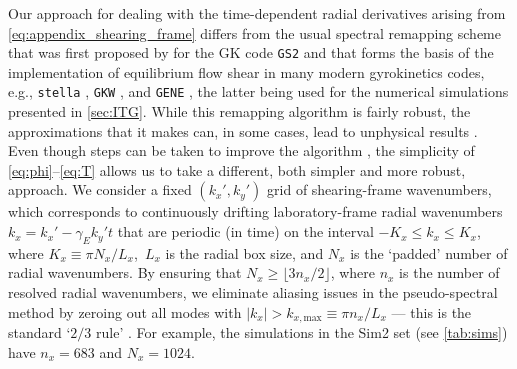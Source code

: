 \documentclass{jpp}
\newcommand{\gammaE}{\gamma_{E}}
\begin{document}
Our approach for dealing with the time-dependent radial derivatives arising from \cref{eq:appendix_shearing_frame} differs from the usual spectral remapping scheme that was first proposed by \mbox{\citet{hammett_flowshear_06}} for the GK code \texttt{GS2} and that forms the basis of the implementation of equilibrium flow shear in many modern gyrokinetics codes, e.g., \texttt{stella} \citep{barnes_stella19, stonge22}, \texttt{GKW} \citep{peeters_gkw09}, and \texttt{GENE} \citep{told_thesis12}, the latter being used for the numerical simulations presented in \cref{sec:ITG}. While this remapping algorithm is fairly robust, the approximations that it makes can, in some cases, lead to unphysical results \citep{mcmillan19}. Even though steps can be taken to improve the algorithm \citep{mcmillan19, christen21}, the simplicity of \mbox{\cref{eq:phi}--\cref{eq:T}} allows us to take a different, both simpler and more robust, approach. We consider a fixed \((k_x', k_y')\) grid of shearing-frame wavenumbers, which corresponds to continuously drifting laboratory-frame radial wavenumbers \mbox{\(k_x = k_x' - \gammaE k_y' t\)} that are periodic (in time) on the interval  \mbox{\(-K_x \leq k_x \leq K_x\)}, where \mbox{\(K_x \equiv \pi N_x/L_x\), \(L_x\)} is the radial box size, and \(N_x\) is the `padded' number of radial wavenumbers. By ensuring that \mbox{\(N_x \geq \lfloor3n_x/2\rfloor\)}, where \(n_x\) is the number of resolved radial wavenumbers, we eliminate aliasing issues in the pseudo-spectral method by zeroing out all modes with \(|k_x| > k_{x, \text{max}} \equiv \pi n_x / L_x\) --- this is the standard `\(2/3\) rule' \citep{orszag71}. For example, the simulations in the Sim2 set (see \cref{tab:sims}) have \(n_x = 683\) and \(N_x = 1024\).
\end{document}
